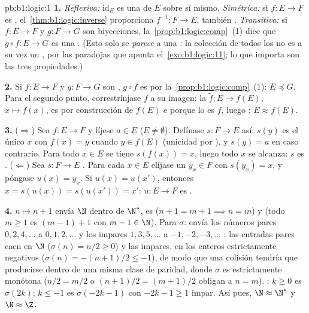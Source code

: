 \begin{solution}{pb:b1:logic:1}
\textbf{1.} \emph{Reflexiva:} $\mathrm{id}_E$ es una  de $E$
sobre sí mismo. \emph{Simétrica:} si $f \colon E \to F$ es ,
el~\cref{thm:b1:logic:inverse} proporciona $f^{-1} \colon F \to E$,
también . \emph{Transitiva:} si $f \colon E \to F$ y
$g \colon F \to G$ son biyecciones, la~\cref{prop:b1:logic:comp}~(1) dice
que $g \circ f \colon E \to G$ es una . (Esto solo se
\emph{parece} a una : la colección de todos los
 no es a su vez un , por las paradojas que apunta
el~\cref{exo:b1:logic:11}; lo que importa son las tres propiedades.)

\textbf{2.} Si $f \colon E \to F$ y $g \colon F \to G$ son
, $g \circ f$ es  por la~\cref{prop:b1:logic:comp}~(1):
$E \preceq G$. Para el segundo punto, correstrínjase $f$ a su imagen: la
 $\tilde f \colon E \to f(E)$, $x \mapsto f(x)$, es
 por construcción de $f(E)$ e  porque lo es $f$,
luego : $E \approx f(E)$.

\textbf{3.} ($\Rightarrow$) Sea $f \colon E \to F$  y fíjese
$a \in E$ ($E \neq \emptyset$). Defínase $s \colon F \to E$ así: $s(y)$
es el único $x$ con $f(x) = y$ cuando $y \in f(E)$ (unicidad por
), y $s(y) = a$ en caso contrario. Para todo $x \in E$ se
tiene $s(f(x)) = x$, luego todo $x$ se alcanza: $s$ es .
($\Leftarrow$) Sea $s \colon F \to E$ . Para cada $x \in
E$ elíjase un $y_x \in F$ con $s(y_x) = x$, y póngase $u(x) = y_x$. Si
$u(x) = u(x')$, entonces $x = s(u(x)) = s(u(x')) = x'$: $u \colon E \to F$
es .

\textbf{4.} $n \mapsto n + 1$ envía $\N$ dentro de $\N^*$, es
 ($n + 1 = m + 1 \implies n = m$) y  (todo
$m \geq 1$ es $(m - 1) + 1$ con $m - 1 \in \N$). Para $\sigma$: envía
los números pares $0, 2, 4, \dots$ a $0, 1, 2, \dots$ y los impares
$1, 3, 5, \dots$ a $-1, -2, -3, \dots$ : las entradas pares
caen en $\N$ ($\sigma(n) = n/2 \geq 0$) y las impares, en los enteros
estrictamente negativos ($\sigma(n) = -(n+1)/2 \leq -1$), de modo que
una colisión tendría que producirse dentro de una misma clase de
paridad, donde $\sigma$ es estrictamente monótona ($n/2 = m/2$ o
$(n+1)/2 = (m+1)/2$ obligan a $n = m$). : $k \geq 0$ es
$\sigma(2k)$; $k \leq -1$ es $\sigma(-2k - 1)$ con $-2k - 1 \geq 1$
impar. Así pues, $\N \approx \N^*$ y $\N \approx \Z$.


\end{solution}
